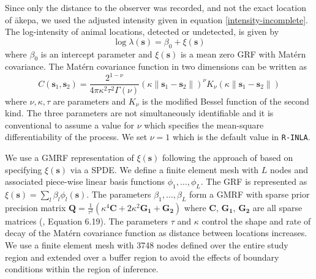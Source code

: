\documentclass{stylefile16/statsoc}
\newcommand{\bs}{\mathbf{s}}
\newcommand{\bm}{\boldsymbol}  %
\newcommand{\akepa}{\textquotesingle\={a}kepa}  %
\begin{document}
Since only the distance to the observer was recorded, and not the exact location of \akepa{}, we used the adjusted intensity given in equation \eqref{intensity-incomplete}.  The log-intensity of animal locations, detected or undetected, is given by
\begin{equation*}
\log \lambda(\bs) = \beta_0 + \xi(\bs)
\end{equation*}
where $\beta_0$ is an intercept parameter and $\xi(\bs)$ is a mean zero GRF with Mat\'ern covariance.  The Mat\'ern covariance function in two dimensions can be written as 
\begin{equation}
C(\bs_1,\bs_2) = \frac{2^{1-\nu}}{4\pi\kappa^2\tau^2\Gamma(\nu)}(\kappa \|\bs_1-\bs_2\|)^{\nu}K_\nu(\kappa \|\bs_1-\bs_2\|)
\end{equation}
where \(\nu, \kappa, \tau\) are parameters and \(K_{\nu}\) is the modified Bessel function of the second kind.  The three parameters are not simultaneously identifiable \citep{zhang_inconsistent_2004} and it is conventional to assume a value for $\nu$ which specifies the mean-square differentiability of the process.  We set $\nu = 1$ which is the default value in \texttt{R-INLA}.

We use a GMRF representation of $\xi(\bs)$ following the approach of \cite{lindgren_explicit_2011} based on specifying $\xi(\bs)$ via a SPDE.  We define a finite element mesh with $L$ nodes and associated piece-wise linear basis functions $\phi_1, \ldots, \phi_L$. The GRF is represented as $\xi(\bs) = \sum_l \beta_l \phi_l(\bs)$.  The parameters $\beta_1, \ldots, \beta_L$ form a GMRF with sparse prior precision matrix $\bm{Q} = \frac{1}{\tau^2}\left(\kappa^4\bm{C} + 2\kappa^2\bm{G_1} + \bm{G_2}\right)$ where $\bm{C}$, $\bm{G_1}$, $\bm{G_2}$ are all sparse matrices (\cite{blangiardo_spatial_2013}, Equation 6.19). The parameters $\tau$ and $\kappa$ control the shape and rate of decay of the Mat\'ern covariance function as distance between locations increases. We use a finite element mesh with 3748 nodes defined over the entire study region and extended over a buffer region to avoid the effects of boundary conditions within the region of inference.
\end{document}
